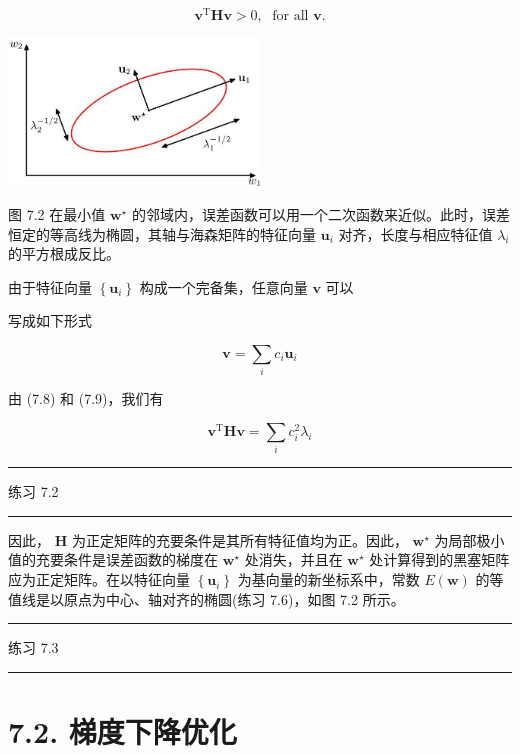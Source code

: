 \documentclass[10pt]{article}
\newcommand{\HRule}{\begin{center}\rule{0.9\linewidth}{0.2mm}\end{center}}
\begin{document}
\[
{\mathbf{v}}^{\mathrm{T}}\mathbf{H}\mathbf{v} > 0,\;\text{ for all }\mathbf{v}. \tag{7.12}
\]

\begin{center}
\includegraphics[max width=0.5\textwidth]{images/0194e279-9b28-703a-88f4-c3ac21e2010d_232_872_344_663_393_0.jpg}
\end{center}
\hspace*{3em} 

图 7.2 在最小值 \({\mathbf{w}}^{ \star  }\) 的邻域内，误差函数可以用一个二次函数来近似。此时，误差恒定的等高线为椭圆，其轴与海森矩阵的特征向量 \({\mathbf{u}}_{i}\) 对齐，长度与相应特征值 \({\lambda }_{i}\) 的平方根成反比。

由于特征向量 \(\left\{  {\mathbf{u}}_{i}\right\}\) 构成一个完备集，任意向量 \(\mathbf{v}\) 可以

写成如下形式

\[
\mathbf{v} = \mathop{\sum }\limits_{i}{c}_{i}{\mathbf{u}}_{i} \tag{7.13}
\]

由 (7.8) 和 (7.9)，我们有

\[
{\mathbf{v}}^{\mathrm{T}}\mathbf{H}\mathbf{v} = \mathop{\sum }\limits_{i}{c}_{i}^{2}{\lambda }_{i} \tag{7.14}
\]

\HRule

练习 7.2

\HRule

因此， \(\mathbf{H}\) 为正定矩阵的充要条件是其所有特征值均为正。因此， \({\mathbf{w}}^{ \star  }\) 为局部极小值的充要条件是误差函数的梯度在 \({\mathbf{w}}^{ \star  }\) 处消失，并且在 \({\mathbf{w}}^{ \star  }\) 处计算得到的黑塞矩阵应为正定矩阵。在以特征向量 \(\left\{  {\mathbf{u}}_{i}\right\}\) 为基向量的新坐标系中，常数 \(E\left( \mathbf{w}\right)\) 的等值线是以原点为中心、轴对齐的椭圆(练习 7.6)，如图 7.2 所示。

\HRule

练习 7.3

\HRule

\section*{7.2. 梯度下降优化}
\end{document}
